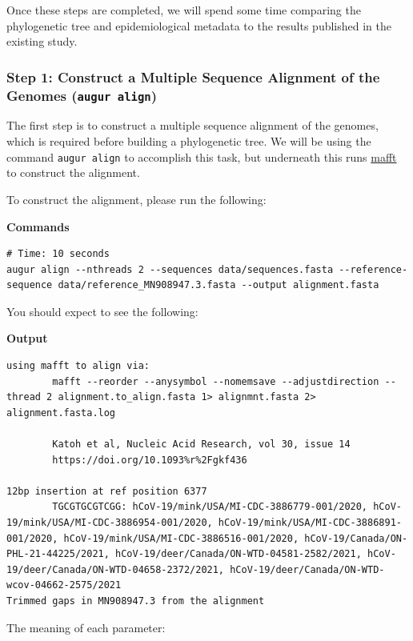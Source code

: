 \documentclass[
]{book}
\begin{document}
Once these steps are completed, we will spend some time comparing the phylogenetic tree and epidemiological metadata to the results published in the existing study.

\subsubsection{\texorpdfstring{Step 1: Construct a Multiple Sequence Alignment of the Genomes (\texttt{augur\ align})}{Step 1: Construct a Multiple Sequence Alignment of the Genomes (augur align)}}\label{step-1-construct-a-multiple-sequence-alignment-of-the-genomes-augur-align}

The first step is to construct a multiple sequence alignment of the genomes, which is required before building a phylogenetic tree. We will be using the command \texttt{augur\ align} to accomplish this task, but underneath this runs \href{https://mafft.cbrc.jp/alignment/software/}{mafft} to construct the alignment.

To construct the alignment, please run the following:

\textbf{Commands}

\begin{verbatim}
# Time: 10 seconds
augur align --nthreads 2 --sequences data/sequences.fasta --reference-sequence data/reference_MN908947.3.fasta --output alignment.fasta
\end{verbatim}

You should expect to see the following:

\textbf{Output}

\begin{verbatim}
using mafft to align via:
        mafft --reorder --anysymbol --nomemsave --adjustdirection --thread 2 alignment.to_align.fasta 1> alignmnt.fasta 2> alignment.fasta.log

        Katoh et al, Nucleic Acid Research, vol 30, issue 14
        https://doi.org/10.1093%r%2Fgkf436

12bp insertion at ref position 6377
        TGCGTGCGTCGG: hCoV-19/mink/USA/MI-CDC-3886779-001/2020, hCoV-19/mink/USA/MI-CDC-3886954-001/2020, hCoV-19/mink/USA/MI-CDC-3886891-001/2020, hCoV-19/mink/USA/MI-CDC-3886516-001/2020, hCoV-19/Canada/ON-PHL-21-44225/2021, hCoV-19/deer/Canada/ON-WTD-04581-2582/2021, hCoV-19/deer/Canada/ON-WTD-04658-2372/2021, hCoV-19/deer/Canada/ON-WTD-wcov-04662-2575/2021
Trimmed gaps in MN908947.3 from the alignment
\end{verbatim}

The meaning of each parameter:
\end{document}
